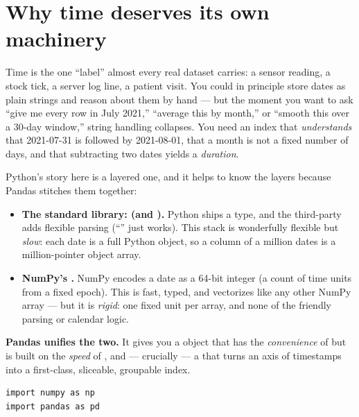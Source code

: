 \documentclass[11pt]{article}
\begin{document}

\section{Why time deserves its own machinery}

\begin{background}
Time is the one ``label'' almost every real dataset carries: a sensor reading, a stock tick, a server log line, a patient visit. You could in principle store dates as plain strings and reason about them by hand --- but the moment you want to ask ``give me every row in July 2021,'' ``average this by month,'' or ``smooth this over a 30-day window,'' string handling collapses. You need an index that \emph{understands} that 2021-07-31 is followed by 2021-08-01, that a month is not a fixed number of days, and that subtracting two dates yields a \emph{duration}.

Python's story here is a layered one, and it helps to know the layers because Pandas stitches them together:
\begin{itemize}
  \item \textbf{The standard library:  (and ).} Python ships a  type, and the third-party  adds flexible parsing (``'' just works). This stack is wonderfully flexible but \emph{slow}: each date is a full Python object, so a column of a million dates is a million-pointer object array.
  \item \textbf{NumPy's .} NumPy encodes a date as a 64-bit integer (a count of time units from a fixed epoch). This is fast, typed, and vectorizes like any other NumPy array --- but it is \emph{rigid}: one fixed unit per array, and none of the friendly parsing or calendar logic.
\end{itemize}
\textbf{Pandas unifies the two.} It gives you a  object that has the \emph{convenience} of  but is built on the \emph{speed} of , and --- crucially --- a  that turns an axis of timestamps into a first-class, sliceable, groupable index.
\end{background}

\begin{lstlisting}
import numpy as np
import pandas as pd
\end{lstlisting}
\end{document}
